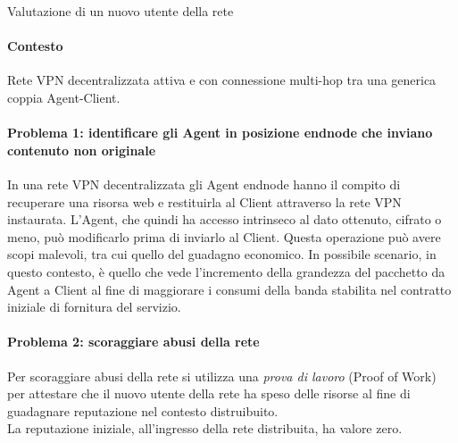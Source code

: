 	{\Large Valutazione di un nuovo utente della rete}
	\paragraph{Contesto}
	Rete VPN decentralizzata attiva e con connessione multi-hop tra una generica coppia Agent-Client.
	
	\paragraph{Problema 1: identificare gli Agent in posizione endnode che inviano contenuto non originale}
	In una rete VPN decentralizzata gli Agent endnode hanno il compito di recuperare una risorsa web e restituirla al Client attraverso la rete VPN instaurata. L'Agent, che quindi ha accesso intrinseco al dato ottenuto, cifrato o meno, può modificarlo prima di inviarlo al Client. Questa operazione può avere scopi malevoli, tra cui quello del guadagno economico. In possibile scenario, in questo contesto, è quello che vede l'incremento della grandezza del pacchetto da Agent a Client al fine di maggiorare i consumi della banda stabilita nel contratto iniziale di fornitura del servizio.
	
	\paragraph{Problema 2: scoraggiare abusi della rete}
	Per scoraggiare abusi della rete si utilizza una \textit{prova di lavoro} (Proof of Work) per attestare che il nuovo utente della rete ha speso delle risorse al fine di guadagnare reputazione nel contesto distruibuito.\\
	La reputazione iniziale, all'ingresso della rete distribuita, ha valore zero.
	
